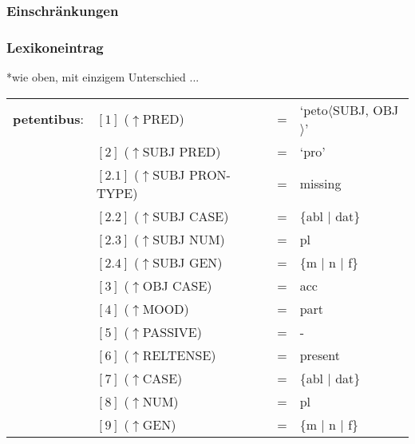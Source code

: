 \documentclass[12pt,a4paper]{article}
\begin{document}
\subsubsection{Einschränkungen}
\subsubsection{Lexikoneintrag}
*wie oben, mit einzigem Unterschied ...

\begin{singlespace}
\begin{tabular}{ l  l  l  l  } 
\textbf{petentibus}: & $[1]$ \:  ($\uparrow$PRED) & = & `peto$\langle$SUBJ, OBJ$\rangle$' \\
$\qquad$ & $[2]$ \:  ($\uparrow$SUBJ PRED) & = & `pro' \\
$\qquad$ & $[2.1]$ \:  ($\uparrow$SUBJ PRON-TYPE) & = & missing \\
$\qquad$ & $[2.2]$ \:  ($\uparrow$SUBJ CASE) & = & \{abl $\mid$ dat\} \\
$\qquad$ & $[2.3]$ \:  ($\uparrow$SUBJ NUM) & = & pl \\
$\qquad$ & $[2.4]$ \:  ($\uparrow$SUBJ GEN) & = & \{m $\mid$ n $\mid$ f\} \\
$\qquad$ & $[3]$ \:  ($\uparrow$OBJ CASE) & = & acc \\
$\qquad$ & $[4]$ \:  ($\uparrow$MOOD) & = & part\\
$\qquad$ & $[5]$ \:  ($\uparrow$PASSIVE) & = & - \\
$\qquad$ & $[6]$ \:  ($\uparrow$RELTENSE) & = & present \\ 
$\qquad$ & $[7]$ \:  ($\uparrow$CASE) & = & \{abl $\mid$ dat\} \\
$\qquad$ & $[8]$ \:  ($\uparrow$NUM) & = & pl \\
$\qquad$ & $[9]$ \:  ($\uparrow$GEN) & = & \{m $\mid$ n $\mid$ f\} \\
\end{tabular}
\newline
\newline
\end{singlespace}
\end{document}
